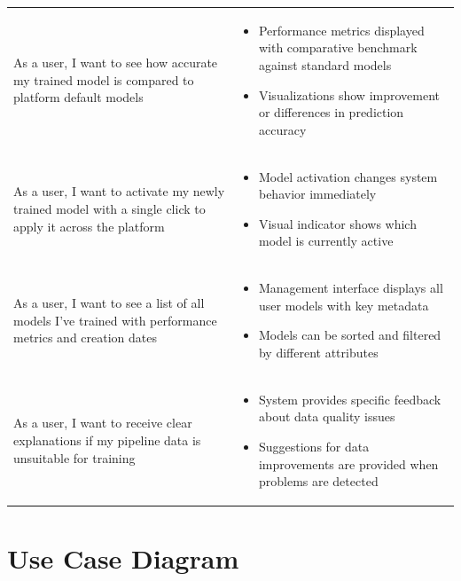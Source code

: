\begin{longtable}{>{\raggedright\arraybackslash}p{}>{\raggedright\arraybackslash}p{}}
	\rowcolor[gray]{0.95}
	As a user, I want to see how accurate my trained model is compared to platform default models &
	\begin{itemize}
	\item Performance metrics displayed with comparative benchmark against standard models
	\item Visualizations show improvement or differences in prediction accuracy
	\end{itemize} \\
	  
	As a user, I want to activate my newly trained model with a single click to apply it across the platform &
	\begin{itemize}
	\item Model activation changes system behavior immediately
	\item Visual indicator shows which model is currently active
	\end{itemize} \\
	  
	\rowcolor[gray]{0.95}
	As a user, I want to see a list of all models I've trained with performance metrics and creation dates &
	\begin{itemize}
	\item Management interface displays all user models with key metadata
	\item Models can be sorted and filtered by different attributes
	\end{itemize} \\
	  
	As a user, I want to receive clear explanations if my pipeline data is unsuitable for training &
	\begin{itemize}
	\item System provides specific feedback about data quality issues
	\item Suggestions for data improvements are provided when problems are detected
	\end{itemize} \\
	
\end{longtable}

\pagebreak
\section{Use Case Diagram}

